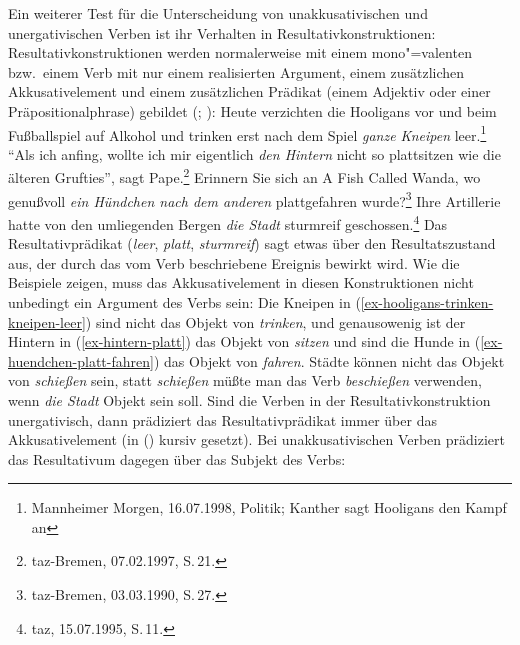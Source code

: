 Ein weiterer Test für die Unterscheidung von unakkusativischen und unergativischen
Verben ist ihr Verhalten in Resultativkonstruktionen:
Resultativkonstruktionen werden normalerweise mit einem mono"=valenten bzw.\
einem Verb mit nur einem realisierten Argument, einem zusätzlichen Akkusativelement
und einem zusätzlichen Prädikat (einem Adjektiv oder einer Präpositionalphrase)
gebildet (\citealp{Wunderlich97c}; \citealp[Kapitel~5]{Mueller2002b}):
\eal
\ex  Heute verzichten die Hooligans vor und beim Fußballspiel auf Alkohol und trinken 
      erst nach dem Spiel \emph{ganze Kneipen} leer\iw{leer}.\label{ex-hooligans-trinken-kneipen-leer}\footnote{
        Mannheimer Morgen, 16.07.1998, Politik; Kanther sagt Hooligans den Kampf an
}
\ex\label{ex-hintern-platt} "`Als ich anfing, wollte ich mir eigentlich \emph{den Hintern} nicht so plattsitzen 
wie die älteren Grufties"', sagt Pape.\footnote{
        taz-Bremen, 07.02.1997, S.\,21.%
}
\ex Erinnern Sie sich an A Fish Called Wanda, wo genußvoll \emph{ein Hündchen nach dem anderen} plattgefahren wurde?\label{ex-huendchen-platt-fahren}\footnote{
        taz-Bremen, 03.03.1990, S.\,27.%
        }
\ex{}
Ihre Artillerie hatte von  den umliegenden Bergen    \emph{die Stadt} sturmreif  geschossen.\label{ex-hatte-die-stadt-sturmreif-geschossen}\footnote{
taz, 15.07.1995, S.\,11.%
}
\zl
Das Resultativprädikat (\emph{leer}, \emph{platt}, \emph{sturmreif}) sagt etwas über den Resultatszustand aus,
der durch das vom Verb beschriebene Ereignis bewirkt wird.
Wie die Beispiele zeigen, muss das Akkusativelement in diesen Konstruktionen nicht unbedingt
ein Argument des Verbs sein: Die Kneipen in (\ref{ex-hooligans-trinken-kneipen-leer}) 
sind nicht das Objekt von \emph{trinken}, und genausowenig ist der Hintern in (\ref{ex-hintern-platt}) das Objekt von
\emph{sitzen} und sind die Hunde in (\ref{ex-huendchen-platt-fahren}) das Objekt von \emph{fahren}. Städte können nicht das Objekt
von \emph{schießen} sein, statt \emph{schießen} müßte man das Verb \emph{beschießen} verwenden, wenn \emph{die Stadt}
Objekt sein soll. Sind die Verben in der Resultativkonstruktion unergativisch, dann prädiziert
das Resultativprädikat immer über das Akkusativelement (in (\mex{0}) kursiv gesetzt). Bei unakkusativischen Verben
prädiziert das Resultativum dagegen über das Subjekt des Verbs:
